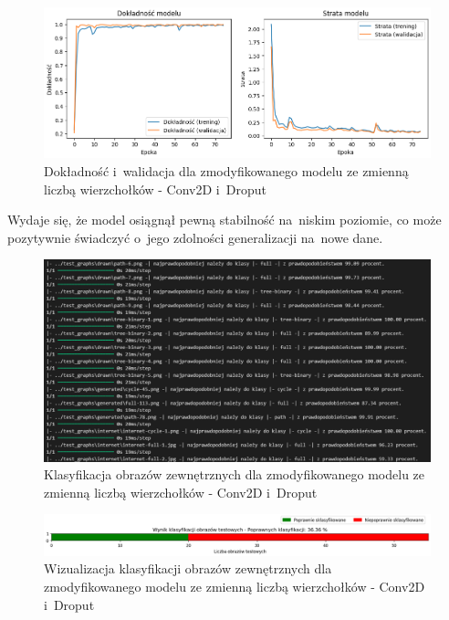 \begin{figure}[ht]
	\centering
	\includegraphics[width=15.5cm]{resources/tests/images/v4/multiple_edges_1_img.png}
	\caption{Dokładność i~walidacja dla zmodyfikowanego modelu ze zmienną liczbą wierzchołków - Conv2D i~Droput}
	\label{Fig:tests-var-1a}
\end{figure}
\FloatBarrier

Wydaje się, że model osiągnął pewną stabilność na~niskim poziomie, co może pozytywnie świadczyć o~jego zdolności generalizacji na~nowe dane.

\begin{figure}[ht]
	\centering
	\includegraphics[width=15.5cm]{resources/tests/images/v4/multiple_edges_1_txt.png}
	\caption{Klasyfikacja obrazów zewnętrznych dla zmodyfikowanego modelu ze zmienną liczbą wierzchołków - Conv2D i~Droput}
	\label{Fig:tests-var-1b}
\end{figure}
\FloatBarrier

\begin{figure}[ht]
	\centering
	\includegraphics[width=15.5cm]{resources/tests/images/v4/multiple_edges_1_bar.png}
	\caption{Wizualizacja klasyfikacji obrazów zewnętrznych dla zmodyfikowanego modelu ze zmienną liczbą wierzchołków - Conv2D i~Droput}
	\label{Fig:tests-var-1c}
\end{figure}
\FloatBarrier

